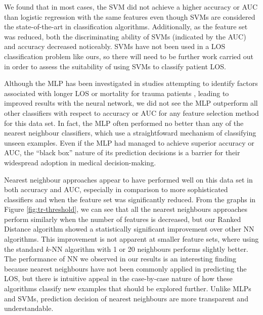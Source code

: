 \documentclass{article}
\begin{document}
We found that in most cases, the SVM did not achieve a higher accuracy or
AUC than logistic regression with the same features even though SVMs are
considered the state-of-the-art in classification algorithms. Additionally,
as the feature set was reduced, both the discriminating ability of SVMs
(indicated by the AUC) and accuracy decreased noticeably. SVMs have not been
used in a LOS classification problem like
ours, so there will need to be further work carried out in order to assess the
suitability of using SVMs to classify patient LOS.

Although the MLP has been investigated in studies attempting to identify
factors associated with longer LOS or mortality for trauma patients
\cite{Hunter2000,McGonigal1993}, leading to improved results with the neural
network, we did not see the MLP outperform all other classifiers with respect
to accuracy or AUC for any feature selection method for this data set. In fact,
the MLP often performed no better than any of the nearest neighbour
classifiers, which use a straightfoward mechanism of classifying unseen
examples. Even if the MLP had managed to achieve superior accuracy or AUC, the
``black box'' nature of its prediction decisions is a barrier for their
widespread adoption in medical decision-making.

Nearest neighbour approaches appear to have performed well on this data set in
both accuracy and AUC, especially in comparison to more sophisticated
classifiers and when the feature set was significantly reduced. From the graphs
in Figure \ref{fig:tr-threshold}, we can see that all the nearest neighbours
approaches perform similarly when the number of features is decreased, but our
Ranked Distance algorithm showed a statistically significant improvement over
other NN algorithms. This
improvement is not apparent at smaller feature sets, where using the standard
$k$-NN algorithm with 1 or 20 neighbours performs slightly better.
The performance of NN we observed in our results is
an interesting finding because nearest neighbours have not been commonly
applied in predicting the LOS, but there is intuitive appeal in the
case-by-case nature of how these algorithms classify new examples that should
be explored further. Unlike MLPs and SVMs, prediction decision of nearest
neighbours are more transparent and understandable.
\end{document}
